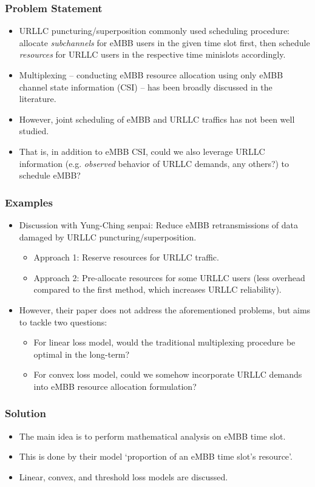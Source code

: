 \documentclass{beamer}
\begin{document}
\begin{frame}
  \frametitle{Problem Statement}
  \begin{itemize}
    \item URLLC puncturing/superposition commonly used scheduling procedure: allocate \emph{subchannels} for eMBB users in the given time slot first, then schedule \emph{resources} for URLLC users in the respective time minislots accordingly.
    \item Multiplexing -- conducting eMBB resource allocation using only eMBB channel state information (CSI) -- has been broadly discussed in the literature.
    \item However, joint scheduling of eMBB and URLLC traffics has not been well studied.
    \item That is, in addition to eMBB CSI, could we also leverage URLLC information (e.g. \emph{observed} behavior of URLLC demands, any others?) to schedule eMBB?
  \end{itemize}
\end{frame}

\begin{frame}
  \frametitle{Examples}
  \begin{itemize}
    \item Discussion with Yung-Ching senpai: Reduce eMBB retransmissions of data damaged by URLLC puncturing/superposition.
      \begin{itemize}
        \item Approach 1: Reserve resources for URLLC traffic.
        \item Approach 2: Pre-allocate resources for some URLLC users (less overhead compared to the first method, which increases URLLC reliability).
      \end{itemize}
    \item However, their paper does not address the aforementioned problems, but aims to tackle two questions:
      \begin{itemize}
        \item For linear loss model, would the traditional multiplexing procedure be optimal in the long-term?
        \item For convex loss model, could we somehow incorporate URLLC demands into eMBB resource allocation formulation?
      \end{itemize}
  \end{itemize}
\end{frame}

\begin{frame}
  \frametitle{Solution}
  \begin{itemize}
    \item The main idea is to perform mathematical analysis on eMBB time slot.
    \item This is done by their model `proportion of an eMBB time slot's resource'.
    \item Linear, convex, and threshold loss models are discussed.
  \end{itemize}
\end{frame}
\end{document}
